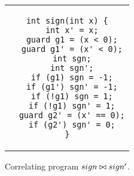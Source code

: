 \begin{figure}
\centering
\begin{tabular}{c}
\begin{lstlisting}
int sign(int x) {
  int x' = x;
  guard g1 = (x < 0);
  guard g1' = (x' < 0);
  int sgn;
  int sgn';
  if (g1) sgn = -1;
  if (g1') sgn' = -1;
  if (!g1) sgn = 1;
  if (!g1) sgn' = 1;
  guard g2' = (x' == 0);
  if (g2') sgn' = 0;
}
\end{lstlisting}
\end{tabular}
\caption{Correlating program $sign \bowtie sign'$.}
\end{figure}
